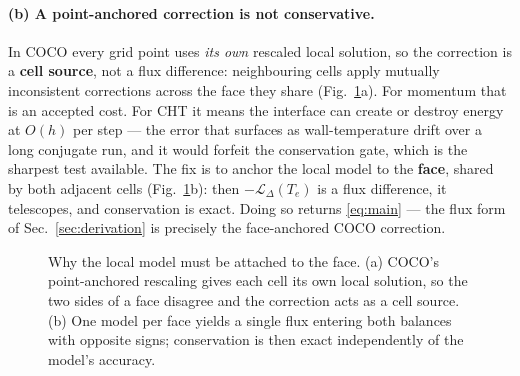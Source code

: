 \documentclass[11pt,a4paper]{article}
\begin{document}
\paragraph{(b) A point-anchored correction is not conservative.}
In COCO every grid point uses \emph{its own} rescaled local solution, so the
correction is a \textbf{cell source}, not a flux difference: neighbouring cells
apply mutually inconsistent corrections across the face they share
(Fig.~\ref{fig:anchor}a). For momentum that is an accepted cost. For CHT it
means the interface can create or destroy energy at $O(h)$ per step --- the
error that surfaces as wall-temperature drift over a long conjugate run, and it
would forfeit the conservation gate, which is the sharpest test available.
The fix is to anchor the local model to the \textbf{face}, shared by both
adjacent cells (Fig.~\ref{fig:anchor}b): then $-\mathcal{L}_\Delta(T_e)$ is a
flux difference, it telescopes, and conservation is exact. Doing so returns
\eqref{eq:main} --- the flux form of Sec.~\ref{sec:derivation} is precisely the
face-anchored COCO correction.

\begin{figure}[htbp]
\centering
{}
\caption{Why the local model must be attached to the face. (a) COCO's
point-anchored rescaling gives each cell its own local solution, so the two
sides of a face disagree and the correction acts as a cell source. (b) One
model per face yields a single flux entering both balances with opposite signs;
conservation is then exact independently of the model's accuracy.}
\label{fig:anchor}
\end{figure}
\end{document}
